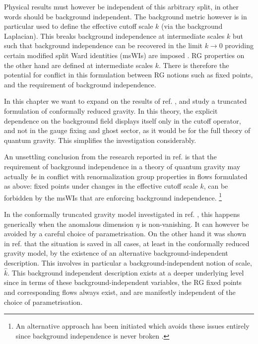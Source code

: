 \documentclass[11pt]{book} %
\numberwithin{equation}{chapter}
\begin{document}
Physical results must however be independent of this arbitrary split,
in other words should be background independent.
The background metric however is in particular used
to define the effective cutoff scale $k$ (via the background Laplacian).
This breaks background independence at intermediate scales $k$ but such that background
independence can be recovered in the limit $k\to0$ providing certain modified split Ward
identities (msWIs) are imposed
\cite{Pawlowski:2005xe, Litim:2002hj, Bridle:2013sra, Reuter:1997gx, Litim:1998nf, Litim:2002ce,
Manrique:2009uh, Manrique:2010mq, Manrique:2010am, Dietz:2015owa, Safari:2015dva}.
RG properties on the other hand are defined at intermediate scales $k$.
There is therefore the potential for conflict in this formulation between RG notions such as fixed points,
and the requirement of background independence.

In this chapter we want to expand on the results of ref. \cite{Dietz:2015owa}, and study
a truncated formulation of conformally reduced gravity. In this theory, the explicit dependence
on the background field displays itself only in the cutoff operator, and not in the gauge
fixing and ghost sector, as it would be for the full theory of quantum gravity.
This simplifies the investigation considerably.

An unsettling conclusion from the research reported in ref. \cite{Dietz:2015owa} is that the
requirement of background independence in a theory of quantum gravity may actually \textit{be}
in conflict with renormalization group properties in flows formulated as above:
fixed points under changes in the effective cutoff scale $k$, can be forbidden by the msWIs
that are enforcing background independence.%
\footnote{An alternative approach has been initiated which avoids
these issues entirely since background independence is never broken \cite{Morris:2016nda}.}

In the conformally truncated gravity model investigated in ref. \cite{Dietz:2015owa},
this happens generically when the anomalous dimension $\eta$ is non-vanishing.
It can however be avoided by a careful choice of parametrisation.
On the other hand it was shown in ref. \cite{Dietz:2015owa} that the situation is saved in all cases,
at least in the conformally reduced gravity model,
by the existence of an alternative background-independent description.
This involves in particular a background-independent notion of scale, $\hat{k}$.
This background independent description exists at a deeper underlying level since in terms
of these background-independent variables, the RG fixed points and corresponding flows always exist,
and are manifestly independent of the choice of parametrisation.
\end{document}
